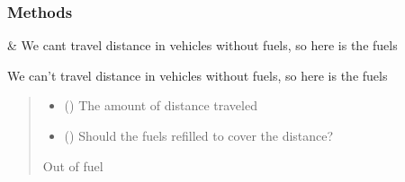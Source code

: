 \documentclass[letterpaper,10pt,english]{sphinxmanual}
\begin{document}
\begin{fulllineitems}
\begin{fulllineitems}
\end{fulllineitems}

\subsubsection*{Methods}


\begin{savenotes}\sphinxattablestart
\centering
\begin{tabulary}{\linewidth}[t]{}
\hline

\sphinxAtStartPar
{\hyperref[\detokenize{_autosummary/module.dummycode.NumpyVehicle:module.dummycode.NumpyVehicle.cars}]{}}
&
\sphinxAtStartPar
We can\textquotesingle{}t travel distance in vehicles without fuels, so here is the fuels
\\
\hline
\end{tabulary}
\par
\sphinxattableend\end{savenotes}

\begin{fulllineitems}
\label{\detokenize{_autosummary/module.dummycode.NumpyVehicle:module.dummycode.NumpyVehicle.cars}}
\pysigstartsignatures
{}
\pysigstopsignatures
\sphinxAtStartPar
We can’t travel distance in vehicles without fuels, so here is the fuels
\begin{quote}\begin{description}
\begin{itemize}
\item {} 
\sphinxAtStartPar
{} () \textendash{} The amount of distance traveled

\item {} 
\sphinxAtStartPar
{} () \textendash{} Should the fuels refilled to cover the distance?

\end{itemize}

\sphinxAtStartPar
{} \textendash{} Out of fuel


\end{description}
\end{quote}
\end{fulllineitems}
\end{fulllineitems}
\end{document}
